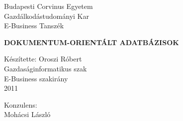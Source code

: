 \begin{raggedright}
Budapesti Corvinus Egyetem \\
Gazdálkodástudományi Kar \\
{\small E-Business Tanszék}
\end{raggedright}

\thispagestyle{empty}

\vspace{3.5cm}

\vspace{0.8cm}
\begin{center}
\textbf{\uppercase{\Large Dokumentum-orientált adatbázisok}}
\end{center}

\vfill
\begin{raggedleft}
Készítette: Oroszi Róbert\\
Gazdaságinformatikus szak\\
E-Business szakirány\\
2011\\
\end{raggedleft}
\begin{raggedright}
{\Large Konzulens:}\\ Mohácsi László
\end{raggedright}
\vspace{0.6cm}


\clearpage











